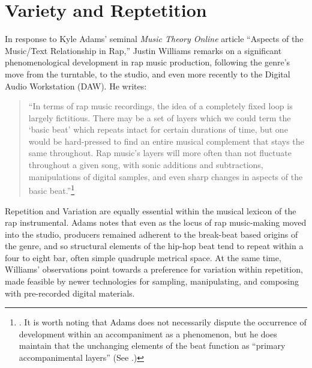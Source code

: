 \onehalfspacing 
\label{chapter2}
\section{Variety and Reptetition}
In response to Kyle Adams' seminal \textit{Music Theory Online} article ``Aspects of the Music/Text Relationship in Rap,'' Justin Williams remarks on a significant phenomenological development in rap music production, following the genre's move from the turntable, to the studio, and even more recently to the Digital Audio Workstation (DAW). He writes:

\begin{quote}
    \small ``In terms of rap music recordings, the idea of a completely fixed loop is largely fictitious. There may be a set of layers which we could term the `basic beat' which repeats intact for certain durations of time, but one would be hard-pressed to find an entire musical complement that stays the same throughout. Rap music’s layers will more often than not fluctuate throughout a given song, with sonic additions and subtractions, manipulations of digital samples, and even sharp changes in aspects of the basic beat.''\footnote{\cite{justinawilliamsBeatsFlowsResponse2009}. It is worth noting that Adams does not necessarily dispute the occurrence of development within an accompaniment as a phenomenon, but he does maintain that the unchanging elements of the beat function as ``primary accompanimental layers'' (See \cite{kyleadamsPeopleInstinctiveAssumptions2009}.)}
\end{quote}

\noindent \normalsize Repetition and Variation are equally essential within the musical lexicon of the rap instrumental. Adams notes that even as the locus of rap music-making moved into the studio, producers remained adherent to the break-beat based origins of the genre, and so structural elements of the hip-hop beat tend to repeat within a four to eight bar, often simple quadruple metrical space. At the same time, Williams' observations point towards a preference for variation within repetition, made feasible by newer technologies for sampling, manipulating, and composing with pre-recorded digital materials.

